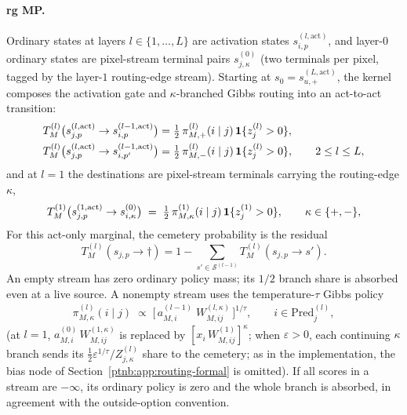 \paragraph{\ac{rg} MP.}
Ordinary states at layers $l \in \{1,\ldots,L\}$ are activation states
$s^{(l,\mathrm{act})}_{i,p}$, and layer-$0$ ordinary states are pixel-stream terminal pairs
$s^{(0)}_{j,\kappa}$ (two terminals per pixel, tagged by the layer-$1$ routing-edge
stream). Starting at $s_0 = s^{(L,\mathrm{act})}_{u,+}$, the kernel composes the
activation gate and $\kappa$-branched Gibbs routing into an act-to-act transition:
\begin{align}
    T^{(l)}_M\bigl(s^{(l,\mathrm{act})}_{j,p} \to s^{(l-1,\mathrm{act})}_{i,p}\bigr)
    &= \tfrac12\,\pi^{(l)}_{M,+}(i \mid j)\,\mathbf{1}\{z_j^{(l)} > 0\},
    \nonumber \\
    T^{(l)}_M\bigl(s^{(l,\mathrm{act})}_{j,p} \to s^{(l-1,\mathrm{act})}_{i,p'}\bigr)
    &= \tfrac12\,\pi^{(l)}_{M,-}(i \mid j)\,\mathbf{1}\{z_j^{(l)} > 0\},
    \qquad 2 \le l \le L,
    \label{ptnb:eq:rg-T-act}
\end{align}
and at $l = 1$ the destinations are pixel-stream terminals carrying the routing-edge $\kappa$,
\begin{align}\label{ptnb:eq:rg-T-pixel}
    T^{(1)}_M\bigl(s^{(1,\mathrm{act})}_{j,p} \to s^{(0)}_{i,\kappa}\bigr)
    \;=\; \tfrac12\,\pi^{(1)}_{M,\kappa}(i \mid j)\,\mathbf{1}\{z_j^{(1)} > 0\},
    \qquad \kappa \in \{+,-\},
\end{align}
For this act-only marginal, the cemetery probability is the residual
\[
T^{(l)}_M(s_{j,p}\to\dagger)=1-\sum_{s'\in\mathcal S^{(l-1)}}T^{(l)}_M(s_{j,p}\to s').
\]
An empty stream has zero ordinary policy mass; its $1/2$ branch share is absorbed
even at a live source. A nonempty stream uses the temperature-$\tau$ Gibbs policy
\begin{align}\label{ptnb:eq:rg-T}
    \pi^{(l)}_{M,\kappa}(i \mid j)
    \;\propto\;
    \bigl[\,a^{(l-1)}_{M,i}\;W^{(l,\kappa)}_{M,ij}\,\bigr]^{1/\tau},
    \qquad i \in \mathrm{Pred}_j^{(l)},
\end{align}
(at $l = 1$, $a_{M,i}^{(0)}\,W^{(1,\kappa)}_{M,ij}$ is replaced by $[x_i\,W^{(1)}_{M,ij}]^\kappa$;
when $\varepsilon>0$, each continuing $\kappa$ branch sends its
$\tfrac12\varepsilon^{1/\tau}/Z^{(l)}_{j,\kappa}$ share to the cemetery; as in the
implementation, the bias node of Section~\ref{ptnb:app:routing-formal} is omitted).
If all scores in a stream are $-\infty$, its ordinary policy is zero and the whole
branch is absorbed, in agreement with the outside-option convention.
